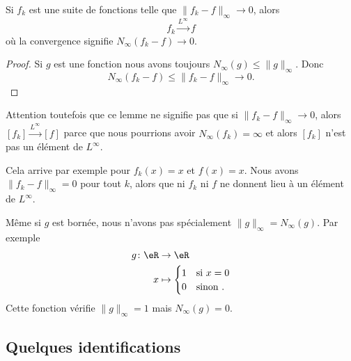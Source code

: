 \begin{lemma}
	Si \( f_k\) est une suite de fonctions telle que \( \| f_k-f \|_{\infty}\to 0\), alors
	\begin{equation}
		f_k\stackrel{L^{\infty}}{\longrightarrow}f
	\end{equation}
	où la convergence signifie \( N_{\infty}(f_k-f)\to 0\).
\end{lemma}

\begin{proof}
	Si \( g\) est une fonction nous avons toujours \( N_{\infty}(g)\leq \| g \|_{\infty}\). Donc
	\begin{equation}
		N_{\infty}(f_k-f)\leq \| f_k-f \|_{\infty}\to 0.
	\end{equation}
\end{proof}

\begin{normaltext}
	Attention toutefois que ce lemme ne signifie pas que si \( \| f_k-f \|_{\infty}\to 0\), alors \(  [f_k]\stackrel{L^{\infty}}{\longrightarrow}[f]  \) parce que nous pourrions avoir \( N_{\infty}(f_k)=\infty\) et alors \( [f_k]\) n'est pas un élément de \( L^{\infty}\).

	Cela arrive par exemple pour \( f_k(x)=x\) et \( f(x)=x\). Nous avons \( \| f_k-f \|_{\infty}=0\) pour tout \( k\), alors que ni \( f_k\) ni \( f\) ne donnent lieu à un élément de \( L^{\infty}\).
\end{normaltext}

\begin{example}
	Même si \( g\) est bornée, nous n'avons pas spécialement \( \| g \|_{\infty}=N_{\infty}(g)\). Par exemple
	\begin{equation}
		\begin{aligned}
			g\colon \eR & \to \eR                            \\
			x           & \mapsto \begin{cases}
				1 & \text{si } x=0 \\
				0 & \text{sinon }.
			\end{cases}
		\end{aligned}
	\end{equation}
	Cette fonction vérifie \( \| g \|_{\infty}=1\) mais \( N_{\infty}(g)=0\).
\end{example}

\subsection{Quelques identifications}

